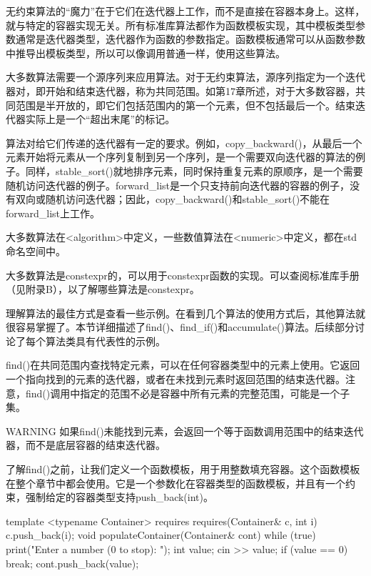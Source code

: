 
无约束算法的“魔力”在于它们在迭代器上工作，而不是直接在容器本身上。这样，就与特定的容器实现无关。所有标准库算法都作为函数模板实现，其中模板类型参数通常是迭代器类型，迭代器作为函数的参数指定。函数模板通常可以从函数参数中推导出模板类型，所以可以像调用普通一样，使用这些算法。

大多数算法需要一个源序列来应用算法。对于无约束算法，源序列指定为一个迭代器对，即开始和结束迭代器，称为共同范围。如第17章所述，对于大多数容器，共同范围是半开放的，即它们包括范围内的第一个元素，但不包括最后一个。结束迭代器实际上是一个“超出末尾”的标记。

算法对给它们传递的迭代器有一定的要求。例如，copy\_backward()，从最后一个元素开始将元素从一个序列复制到另一个序列，是一个需要双向迭代器的算法的例子。同样，stable\_sort()就地排序元素，同时保持重复元素的原顺序，是一个需要随机访问迭代器的例子。forward\_list是一个只支持前向迭代器的容器的例子，没有双向或随机访问迭代器；因此，copy\_backward()和stable\_sort()不能在forward\_list上工作。

大多数算法在<algorithm>中定义，一些数值算法在<numeric>中定义，都在std命名空间中。

大多数算法是constexpr的，可以用于constexpr函数的实现。可以查阅标准库手册（见附录B），以了解哪些算法是constexpr。

理解算法的最佳方式是查看一些示例。在看到几个算法的使用方式后，其他算法就很容易掌握了。本节详细描述了find()、find\_if()和accumulate()算法。后续部分讨论了每个算法类具有代表性的示例。


find()在共同范围内查找特定元素，可以在任何容器类型中的元素上使用。它返回一个指向找到的元素的迭代器，或者在未找到元素时返回范围的结束迭代器。注意，find()调用中指定的范围不必是容器中所有元素的完整范围，可能是一个子集。

\begin{myWarning}{WARNING}
如果find()未能找到元素，会返回一个等于函数调用范围中的结束迭代器，而不是底层容器的结束迭代器。
\end{myWarning}

了解find()之前，让我们定义一个函数模板，用于用整数填充容器。这个函数模板在整个章节中都会使用。它是一个参数化在容器类型的函数模板，并且有一个约束，强制给定的容器类型支持push\_back(int)。

\begin{cpp}
template <typename Container>
    requires requires(Container& c, int i) { c.push_back(i); }
void populateContainer(Container& cont)
{
    while (true) {
        print("Enter a number (0 to stop): ");
        int value;
        cin >> value;
        if (value == 0) { break; }
        cont.push_back(value);
    }
}
\end{cpp}

